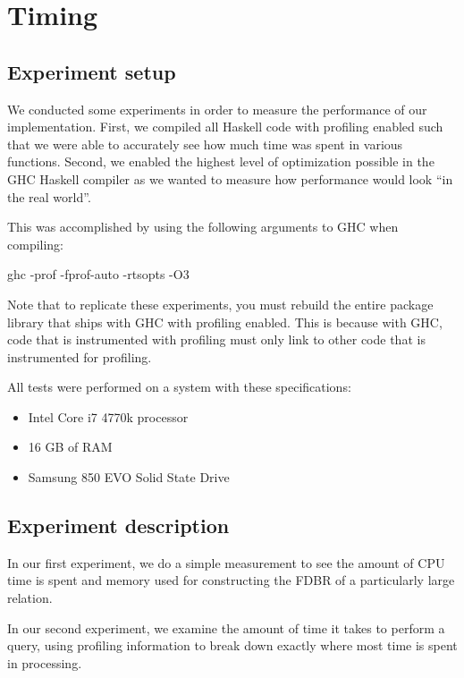 \documentclass[../main.tex]{subfiles}
\begin{document}
\chapter{Timing}

\section{Experiment setup}

We conducted some experiments in order to measure the performance of our implementation.
First, we compiled all Haskell code with profiling enabled such that we were able to accurately see how much time was spent in various functions.
Second, we enabled the highest level of optimization possible in the GHC Haskell compiler as we wanted to measure how performance would look
``in the real world''.

This was accomplished by using the following arguments to GHC when compiling:

\begin{code}
	ghc -prof -fprof-auto -rtsopts -O3
\end{code}

Note that to replicate these experiments, you must rebuild the entire package library that ships with GHC with profiling enabled.
This is because with GHC, code that is instrumented with profiling must only link to other code that is instrumented for profiling.

All tests were performed on a system with these specifications:

\begin{itemize}
	\item Intel Core i7 4770k processor
	\item 16 GB of RAM
	\item Samsung 850 EVO Solid State Drive
\end{itemize}


\section{Experiment description}

In our first experiment, we do a simple measurement to see the amount of CPU time is spent and memory used for constructing the FDBR of
a particularly large relation.

In our second experiment, we examine the amount of time it takes to perform a query, using profiling information to break down
exactly where most time is spent in processing.
\end{document}
